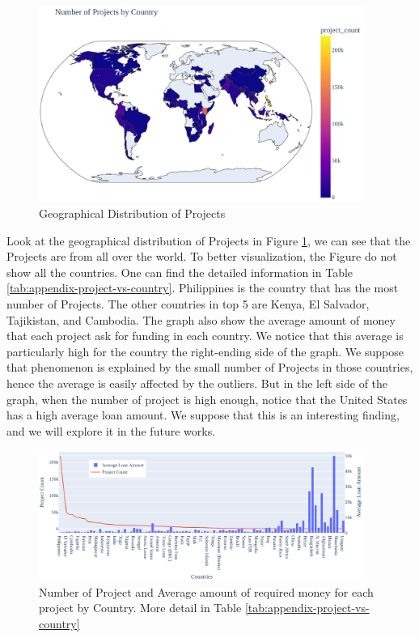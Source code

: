 \begin{figure}[H]
	\centering
	\includegraphics[width=0.95\textwidth]{images/project-vs-country-map.pdf}
	\caption{Geographical Distribution of Projects}
	\label{fig:map-number-project-by-country}
\end{figure}


Look at the geographical distribution of Projects in Figure \ref{fig:map-number-project-by-country},
we can see that the Projects are from all over the world.
To better visualization, the Figure do not show all the countries.
One can find the detailed information in Table \ref{tab:appendix-project-vs-country}.
Philippines is the country that has the most number of Projects.
The other countries in top 5 are Kenya, El Salvador, Tajikistan, and Cambodia.
The graph also show the average amount of money that each project ask for funding in each country.
We notice that this average is particularly high for the country the right-ending side of the graph.
We suppose that phenomenon is explained by the small number of Projects in those countries,
hence the average is easily affected by the outliers.
But in the left side of the graph, when the number of project is high enough,
notice that the United States has a high average loan amount.
We suppose that this is an interesting finding, and we will explore it in the future works.


\begin{figure}[H]
	\centering
	\includegraphics[width=0.95\textwidth]{images/project-vs-country.pdf}
	\caption[Number of Project and Average amount of required money for each project by Country]{
		Number of Project and Average amount of required money for each project by Country.
		More detail in Table \ref{tab:appendix-project-vs-country}
	}
	\label{fig:country-project-distribution}
\end{figure}


